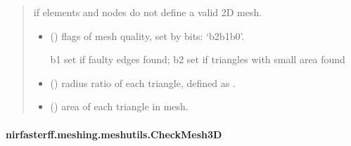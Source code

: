 \documentclass[letterpaper,10pt,english]{sphinxmanual}
\begin{document}
\begin{fulllineitems}
\begin{quote}
\begin{description}
\begin{itemize}
\end{itemize}

\sphinxAtStartPar
{} \textendash{} if elements and nodes do not define a valid 2D mesh.

\sphinxAtStartPar
\begin{itemize}
\item {} 
\sphinxAtStartPar
{} () \textendash{} flags of mesh quality, set by bits: ‘b2b1b0’.

\sphinxAtStartPar
b1 set if faulty edges found; b2 set if triangles with small area found

\item {} 
\sphinxAtStartPar
{} () \textendash{} radius ratio of each triangle, defined as .

\item {} 
\sphinxAtStartPar
{} () \textendash{} area of each triangle in mesh.

\end{itemize}


\end{description}\end{quote}

\end{fulllineitems}


\sphinxstepscope


\paragraph{nirfasterff.meshing.meshutils.CheckMesh3D}
\label{\detokenize{_autosummary/nirfasterff.meshing.meshutils.CheckMesh3D:nirfasterff-meshing-meshutils-checkmesh3d}}\label{\detokenize{_autosummary/nirfasterff.meshing.meshutils.CheckMesh3D::doc}}
\end{document}

